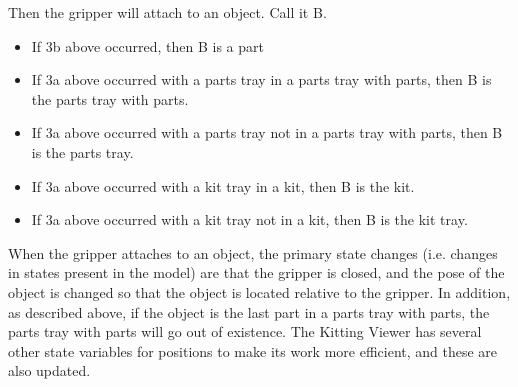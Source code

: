 Then the gripper will attach to an object. Call it B.

\begin{itemize}

\item If 3b above occurred, then B is a part

\item If 3a above occurred with a parts tray in a parts tray with parts,
   then B is the parts tray with parts.

\item If 3a above occurred with a parts tray not in a parts tray with parts,
   then B is the parts tray.

\item If 3a above occurred with a kit tray in a kit, then B is the kit.

\item If 3a above occurred with a kit tray not in a kit, then B is the kit tray.

\end{itemize}

When the gripper attaches to an object, the primary state changes (i.e.
changes in states present in the model) are that the gripper is closed,
and the pose of the object is changed so that the object is located
relative to the gripper. In addition, as described above, if the object is
the last part in a parts tray with parts, the parts tray with parts will go
out of existence. The Kitting Viewer has several other state variables for
positions to make its work more efficient, and these are also updated.

